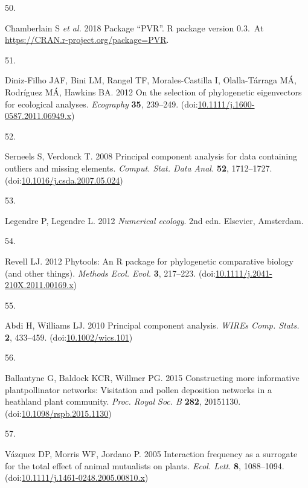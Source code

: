 \documentclass[
  12pt,
  a4paper,
]{article}
\newlength{\cslhangindent}
\newlength{\csllabelwidth}
\newlength{\cslentryspacingunit} %
\newenvironment{CSLReferences}[2] %
 {%
  \setlength{\parindent}{0pt}
  \ifodd #1
  \let\oldpar\par
  \def\par{\hangindent=\cslhangindent\oldpar}
  \fi
  \setlength{\parskip}{#2\cslentryspacingunit}
 }%
 {}
\newcommand{\CSLLeftMargin}[1]{\parbox[t]{\csllabelwidth}{#1}}
\newcommand{\CSLRightInline}[1]{\parbox[t]{\linewidth - \csllabelwidth}{#1}\break}
\begin{document}
\begin{CSLReferences}{0}{0}
\leavevmode{}%
\CSLLeftMargin{50. }
\CSLRightInline{Chamberlain S \emph{et al.} 2018 Package {``{PVR}''}. R package version 0.3.~At \href{https://CRAN.R-project.org/package=PVR}{https://CRAN.r-project.org/package=PVR}. }

\leavevmode{}%
\CSLLeftMargin{51. }
\CSLRightInline{Diniz-Filho JAF, Bini LM, Rangel TF, Morales-Castilla I, Olalla-Tárraga MÁ, Rodríguez MÁ, Hawkins BA. 2012 On the selection of phylogenetic eigenvectors for ecological analyses. \emph{Ecography} \textbf{35}, 239--249. (doi:\href{https://doi.org/10.1111/j.1600-0587.2011.06949.x}{10.1111/j.1600-0587.2011.06949.x})}

\leavevmode{}%
\CSLLeftMargin{52. }
\CSLRightInline{Serneels S, Verdonck T. 2008 Principal component analysis for data containing outliers and missing elements. \emph{Comput. Stat. Data Anal.} \textbf{52}, 1712--1727. (doi:\href{https://doi.org/10.1016/j.csda.2007.05.024}{10.1016/j.csda.2007.05.024})}

\leavevmode{}%
\CSLLeftMargin{53. }
\CSLRightInline{Legendre P, Legendre L. 2012 \emph{Numerical ecology}. {2nd edn}. {Elsevier, Amsterdam}. }

\leavevmode{}%
\CSLLeftMargin{54. }
\CSLRightInline{Revell LJ. 2012 Phytools: An {R} package for phylogenetic comparative biology (and other things). \emph{Methods Ecol. Evol.} \textbf{3}, 217--223. (doi:\href{https://doi.org/10.1111/j.2041-210X.2011.00169.x}{10.1111/j.2041-210X.2011.00169.x})}

\leavevmode{}%
\CSLLeftMargin{55. }
\CSLRightInline{Abdi H, Williams LJ. 2010 Principal component analysis. \emph{WIREs Comp. Stats.} \textbf{2}, 433--459. (doi:\href{https://doi.org/10.1002/wics.101}{10.1002/wics.101})}

\leavevmode{}%
\CSLLeftMargin{56. }
\CSLRightInline{Ballantyne G, Baldock KCR, Willmer PG. 2015 Constructing more informative plant\textendash pollinator networks: Visitation and pollen deposition networks in a heathland plant community. \emph{Proc. Royal Soc. B} \textbf{282}, 20151130. (doi:\href{https://doi.org/10.1098/rspb.2015.1130}{10.1098/rspb.2015.1130})}

\leavevmode{}%
\CSLLeftMargin{57. }
\CSLRightInline{Vázquez DP, Morris WF, Jordano P. 2005 Interaction frequency as a surrogate for the total effect of animal mutualists on plants. \emph{Ecol. Lett.} \textbf{8}, 1088--1094. (doi:\href{https://doi.org/10.1111/j.1461-0248.2005.00810.x}{10.1111/j.1461-0248.2005.00810.x})}


\end{CSLReferences}
\end{document}
